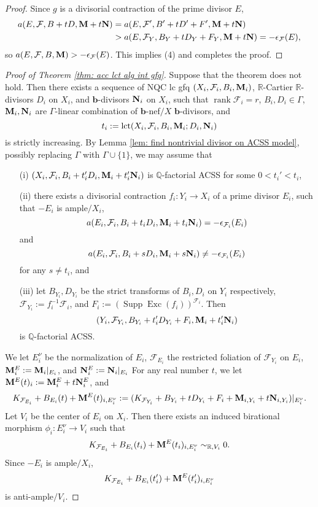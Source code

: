 \documentclass[11pt]{amsart}
\numberwithin{equation}{section}
\newcommand{\bb}{\bm{b}}
\newcommand{\Mm}{{\bf{M}}}
\newcommand{\Nn}{{\bf{N}}}
\newcommand{\Qq}{\mathbb{Q}}
\newcommand{\Rr}{\mathbb{R}}
\newcommand{\Exc}{\operatorname{Exc}}
\newcommand{\rk}{\operatorname{rank}}
\newcommand{\lct}{\operatorname{lct}}
\newcommand{\Supp}{\operatorname{Supp}}
\newcommand{\Ff}{\mathcal{F}}
\newcommand{\Ii}{\Gamma}
\theoremstyle{definition}
\theoremstyle{definition}
\theoremstyle{definition}
\begin{document}
\begin{proof}
Since $g$ is a divisorial contraction of the prime divisor $E$,
\begin{align*}
a(E,\Ff,B+tD,\Mm+t\Nn)&=a(E,\Ff',B'+tD'+F',\Mm+t\Nn)\\
&>a(E,\Ff_Y,B_Y+tD_Y+F_Y,\Mm+t\Nn)=-\epsilon_{\Ff}(E),
\end{align*}
so $a(E,\Ff,B,\Mm)>-\epsilon_{\Ff}(E)$. This implies (4) and completes the proof. 
\end{proof}



\begin{proof}[Proof of Theorem \ref{thm: acc lct alg int gfq}]
Suppose that the theorem does not hold. Then there exists a sequence of NQC lc gfq $(X_i,\Ff_i,B_i,\Mm_i)$, $\Rr$-Cartier $\Rr$-divisors $D_i$ on $X_i$, and $\bb$-divisors $\Nn_i$ on $X_i$, such that $\rk\Ff_i=r$, $B_i,D_i\in\Ii$, $\Mm_i,\Nn_i$ are $\Ii$-linear combination of $\bb$-nef$/X$ $\bb$-divisors, and
$$t_i:=\lct(X_i,\Ff_i,B_i,\Mm_i;D_i,\Nn_i)$$ is strictly increasing. By Lemma \ref{lem: find nontrivial divisor on ACSS model}, possibly replacing $\Ii$ with $\Ii\cup\{1\}$, we may assume that
\begin{itemize}
    \item[(i)] $(X_i,\Ff_i,B_i+t_i'D_i,\Mm_i+t_i'\Nn_i)$ is $\Qq$-factorial ACSS for some $0<t_i'<t_i$,
    \item[(ii)] there exists a divisorial contraction $f_i: Y_i\rightarrow X_i$ of a prime divisor $E_i$, such that $-E_i$ is ample$/X_i$, $$a(E_i,\Ff_i,B_i+t_iD_i,\Mm_i+t_i\Nn_i)=-\epsilon_{\Ff_i}(E_i)$$ 
    and
    $$a(E_i,\Ff_i,B_i+sD_i,\Mm_i+s\Nn_i)\not=-\epsilon_{\Ff_i}(E_i)$$ 
    for any $s\not=t_i$, and
    \item[(iii)] let $B_{Y_i},D_{Y_i}$ be the strict transforms of $B_i,D_i$ on $Y_i$ respectively, $\Ff_{Y_i}:=f_i^{-1}\Ff_i$, and $F_i:=(\Supp\Exc(f_i))^{\Ff_i}$. Then
$$(Y_i,\Ff_{Y_i},B_{Y_i}+t_i'D_{Y_i}+F_i,\Mm_i+t_i'\Nn_i)$$
    is $\Qq$-factorial ACSS.
\end{itemize}
We let $E_i^\nu$ be the normalization of $E_i$, $\Ff_{E_i}$ the restricted foliation of $\Ff_{Y_i}$ on $E_i$, $\Mm^{E}_i:=\Mm_i|_{E_i}$, and $\Nn^E_{i}:=\Nn_i|_{E_i}$
For any real number $t$, we let $\Mm^E(t)_i:=\Mm^E_i+t\Nn^E_i$, and
$$K_{\Ff_{E_i}}+B_{E_i}(t)+\Mm^E(t)_{i,E_i^\nu}:=(K_{\Ff_{Y_i}}+B_{Y_i}+tD_{Y_i}+F_i+\Mm_{i,Y_i}+t\Nn_{i,Y_i})|_{E_i^\nu}.$$
Let $V_i$ be the center of $E_i$ on $X_i$. Then there exists an induced birational morphism $\phi_i: E_i^\nu\rightarrow V_i$ such that
$$K_{\Ff_{E_i}}+B_{E_i}(t_i)+\Mm^E(t_i)_{i,E_i^\nu}\sim_{\mathbb R,V_i}0.$$
Since $-E_i$ is ample$/X_i$,
$$K_{\Ff_{E_i}}+B_{E_i}(t_i')+\Mm^E(t_i')_{i,E_i^\nu}$$
is anti-ample$/V_i$.


\end{proof}
\end{document}
